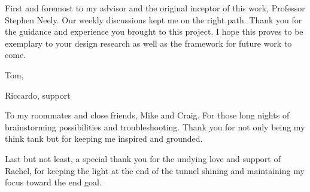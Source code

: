 \documentclass[12pt]{cmuthesis}
\begin{document}
\begin{acknowledgments}
First and foremost to my advisor and the original inceptor of this work, Professor Stephen Neely. Our weekly discussions kept me on the right path. Thank you for the guidance and experience you brought to this project. I hope this proves to be exemplary to your design research as well as the framework for future work to come.

Tom,

Riccardo, support

To my roommates and close friends, Mike and Craig. For those long nights of brainstorming possibilities and troubleshooting. Thank you for not only being my think tank but for keeping me inspired and grounded.

Last but not least, a special thank you for the undying love and support of Rachel, for keeping the light at the end of the tunnel shining and maintaining my focus toward the end goal.

\end{acknowledgments}

\tableofcontents
\listoffigures
\listoftables

\mainmatter


%
%
%
%
%


\newpage\cleardoublepage
\newpage\cleardoublepage
\newpage\cleardoublepage
\newpage\cleardoublepage
\newpage\cleardoublepage
\newpage\cleardoublepage


%

\backmatter


\renewcommand{\bibsection}{\chapter{\bibname}}

\end{document}
